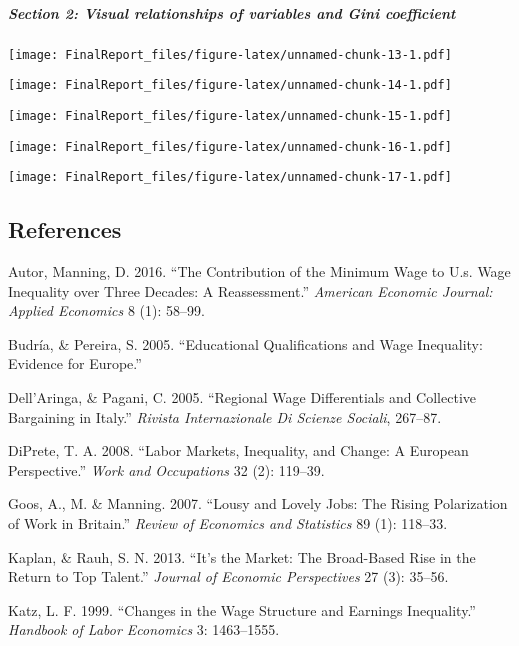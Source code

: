\documentclass[
]{article}
\begin{document}
\hypertarget{section-2-visual-relationships-of-variables-and-gini-coefficient}{%
\subparagraph{Section 2: Visual relationships of variables and Gini
coefficient}\label{section-2-visual-relationships-of-variables-and-gini-coefficient}}

\texttt{[image: FinalReport\_files/figure-latex/unnamed-chunk-13-1.pdf]}

\texttt{[image: FinalReport\_files/figure-latex/unnamed-chunk-14-1.pdf]}

\texttt{[image: FinalReport\_files/figure-latex/unnamed-chunk-15-1.pdf]}

\texttt{[image: FinalReport\_files/figure-latex/unnamed-chunk-16-1.pdf]}

\texttt{[image: FinalReport\_files/figure-latex/unnamed-chunk-17-1.pdf]}

\hypertarget{references}{%
\subsection*{References}\label{references}}

\hypertarget{refs}{}
\leavevmode\hypertarget{ref-autor2010}{}%
Autor, Manning, D. 2016. ``The Contribution of the Minimum Wage to U.s.
Wage Inequality over Three Decades: A Reassessment.'' \emph{American
Economic Journal: Applied Economics} 8 (1): 58--99.

\leavevmode\hypertarget{ref-budria2005}{}%
Budría, \& Pereira, S. 2005. ``Educational Qualifications and Wage
Inequality: Evidence for Europe.''

\leavevmode\hypertarget{ref-pagani2005}{}%
Dell'Aringa, \& Pagani, C. 2005. ``Regional Wage Differentials and
Collective Bargaining in Italy.'' \emph{Rivista Internazionale Di
Scienze Sociali}, 267--87.

\leavevmode\hypertarget{ref-diprete2005}{}%
DiPrete, T. A. 2008. ``Labor Markets, Inequality, and Change: A European
Perspective.'' \emph{Work and Occupations} 32 (2): 119--39.

\leavevmode\hypertarget{ref-goos2007}{}%
Goos, A., M. \& Manning. 2007. ``Lousy and Lovely Jobs: The Rising
Polarization of Work in Britain.'' \emph{Review of Economics and
Statistics} 89 (1): 118--33.

\leavevmode\hypertarget{ref-kaplan2013}{}%
Kaplan, \& Rauh, S. N. 2013. ``It's the Market: The Broad-Based Rise in
the Return to Top Talent.'' \emph{Journal of Economic Perspectives} 27
(3): 35--56.

\leavevmode\hypertarget{ref-katz1999}{}%
Katz, L. F. 1999. ``Changes in the Wage Structure and Earnings
Inequality.'' \emph{Handbook of Labor Economics} 3: 1463--1555.
\end{document}
